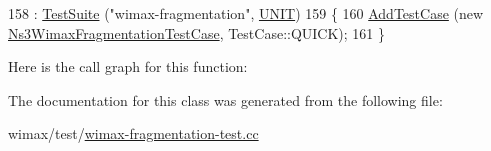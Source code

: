 \begin{DoxyCode}
158   : \hyperlink{classns3_1_1TestSuite_a904b0c40583b744d30908aeb94636d1a}{TestSuite} (\textcolor{stringliteral}{"wimax-fragmentation"}, \hyperlink{classns3_1_1TestSuite_a1ebfcab34ec8161e085e8e3a1855eae0a3885375a3787abf60431f8454b3cadbd}{UNIT})
159 \{
160   \hyperlink{classns3_1_1TestCase_a3718088e3eefd5d6454569d2e0ddd835}{AddTestCase} (\textcolor{keyword}{new} \hyperlink{classNs3WimaxFragmentationTestCase}{Ns3WimaxFragmentationTestCase}, TestCase::QUICK);
161 \}
\end{DoxyCode}


Here is the call graph for this function\+:




The documentation for this class was generated from the following file\+:\begin{DoxyCompactItemize}
\item 
wimax/test/\hyperlink{wimax-fragmentation-test_8cc}{wimax-\/fragmentation-\/test.\+cc}\end{DoxyCompactItemize}
